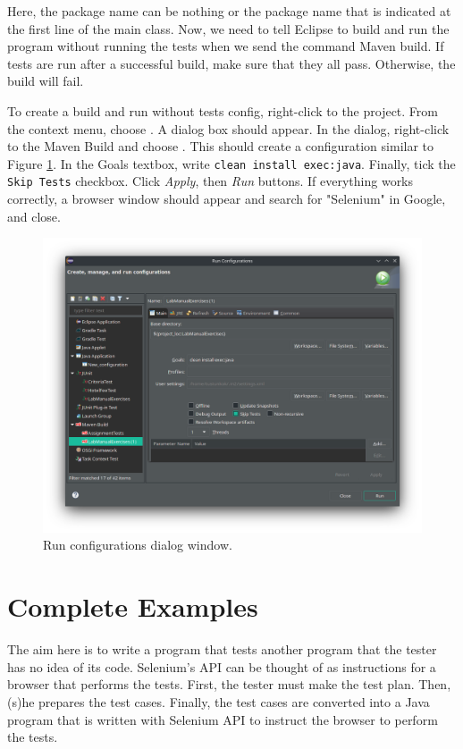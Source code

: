 Here, the package name can be nothing or the package name that is indicated at the first line of the main class. Now, we need to tell Eclipse to build and run the program without running the tests when we send the command Maven build. If tests are run after a successful build, make sure that they all pass. Otherwise, the build will fail.

To create a build and run without tests config, right-click to the project. From the context menu, choose . A dialog box should appear. In the dialog, right-click to the Maven Build and choose . This should create a configuration similar to Figure \ref{fig:run-configs}. In the Goals textbox, write \lstinline[language={}]!clean install exec:java!. Finally, tick the \lstinline[language={}]!Skip Tests! checkbox. Click \emph{Apply}, then \emph{Run} buttons. If everything works correctly, a browser window should appear and search for "Selenium" in Google, and close.

\begin{figure}[H]
    \centering
    \includegraphics[width=\textwidth]{images/maven-run-config.png}
    \caption{Run configurations dialog window.}
    \label{fig:run-configs}
\end{figure}

\section{Complete Examples}
The aim here is to write a program that tests another program that the tester has no idea of its code. Selenium's API can be thought of as instructions for a browser that performs the tests. First, the tester must make the test plan. Then, (s)he prepares the test cases. Finally, the test cases are converted into a Java program that is written with Selenium API to instruct the browser to perform the tests.

